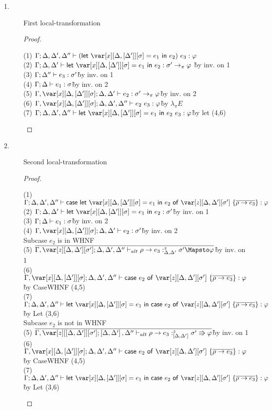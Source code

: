 \begin{description}
\item[1.] First local-transformation
\begin{proof}~
\begin{tabbing}
    (1) $\G; \D, \D', \D'' \vdash (\llet{\xD = e_1}{e_2})~e_3 : \vp$\\
    (2) $\G; \D, \D' \vdash \llet{\xD = e_1}{e_2} : \s' \to_\pi \vp$ \`by inv. on 1\\
    (3) $\Gamma; \Delta'' \vdash e_3 : \sigma'$\`by inv. on 1\\
    (4) $\Gamma; \Delta \vdash e_1 : \sigma$\`by inv. on 2\\
    (5) $\G, \xD; \D, \D' \vdash e_2 : \s' \to_\pi \vp$\`by inv. on 2\\
    (6) $\G, \xD; \D, \D', \D'' \vdash e_2~e_3 : \vp$\` by $\lambda_\pi E$\\
    (7) $\G; \D, \D', \D'' \vdash \llet{\xD = e_1}{e_2~e_3} : \vp$\`by let (4,6)\\
\end{tabbing}
\end{proof}

\item[2.] Second local-transformation
\begin{proof}~
\begin{tabbing}
    (1) $\G; \D, \D', \D'' \vdash \ccase{\llet{\xD = e_1}{e_2}}{\z[\D,\D'][\s']~\{\ov{\rho \to e_3}\}} : \vp$\\
    (2) $\G; \D, \D' \vdash \llet{\xD = e_1}{e_2} : \s'$\`by inv. on 1\\
    (3) $\Gamma; \Delta \vdash e_1 : \sigma$\`by inv. on 2\\
    (4) $\G, \xD;\D,\D' \vdash e_2 : \s'$\`by inv. on 2\\
    Subcase $e_2$ is in WHNF\\
    (5) $\ov{\G,\z[\D,\D'][\s']; \D, \D', \D'' \vdash_{alt} \rho \to e_3 :^z_{\D,\D'} \s' \Mapsto \vp}$\`by inv. on 1\\
    (6) $\G, \xD; \D, \D', \D'' \vdash \ccase{e_2}{\z[\D,\D'][\s']~\{\ov{\rho \to e_3}\}} : \vp$\`by CaseWHNF (4,5)\\
    (7) $\G; \D, \D', \D'' \vdash \llet{\xD = e_1}{\ccase{e_2}{\z[\D,\D'][\s']~\{\ov{\rho \to e_3}\}}} : \vp$\`by Let (3,6)\\
    Subcase $e_2$ is not in WHNF\\
    (5) $\ov{\G,\z[\irr{\D,\D'}][\s']; \irr{\D, \D'}, \D'' \vdash_{alt} \rho \to e_3 :^z_{\irr{\D,\D'}} \s' \Rrightarrow \vp}$\`by inv. on 1\\
    (6) $\G, \xD; \D, \D', \D'' \vdash \ccase{e_2}{\z[\D,\D'][\s']~\{\ov{\rho \to e_3}\}} : \vp$\`by CaseWHNF (4,5)\\
    (7) $\G; \D, \D', \D'' \vdash \llet{\xD = e_1}{\ccase{e_2}{\z[\D,\D'][\s']~\{\ov{\rho \to e_3}\}}} : \vp$\`by Let (3,6)\\
\end{tabbing}
\end{proof}


\end{description}

